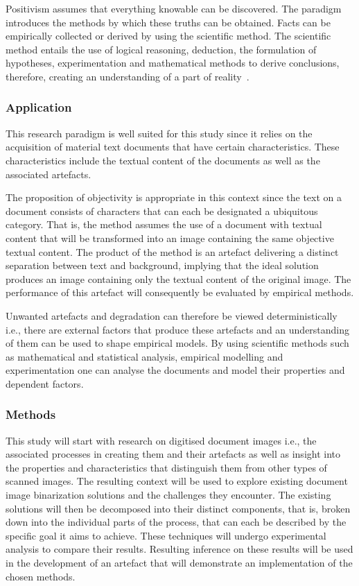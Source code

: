 \documentclass[a4paper, 12pt]{report}
\begin{document}
Positivism assumes that everything knowable can be discovered. The paradigm introduces the methods by which these truths can be obtained. Facts can be empirically collected or derived by using the scientific method. The scientific method entails the use of logical reasoning, deduction, the formulation of hypotheses, experimentation and mathematical methods to derive conclusions, therefore, creating an understanding of a part of reality~\cite{kivunja2017understanding}.

\subsubsection{Application}
This research paradigm is well suited for this study since it relies on the acquisition of material text documents that have certain characteristics. These characteristics include the textual content of the documents as well as the associated artefacts.\par

The proposition of objectivity is appropriate in this context since the text on a document consists of characters that can each be designated a ubiquitous category. That is, the method assumes the use of a document with textual content that will be transformed into an image containing the same objective textual content. The product of the method is an artefact delivering a distinct separation between text and background, implying that the ideal solution produces an image containing only the textual content of the original image. The performance of this artefact will consequently be evaluated by empirical methods.\par

Unwanted artefacts and degradation can therefore be viewed deterministically i.e., there are external factors that produce these artefacts and an understanding of them can be used to shape empirical models. By using scientific methods such as mathematical and statistical analysis, empirical modelling and experimentation one can analyse the documents and model their properties and dependent factors.


\subsubsection{Methods}
This study will start with research on digitised document images i.e., the associated processes in creating them and their artefacts as well as insight into the properties and characteristics that distinguish them from other types of scanned images. The resulting context will be used to explore existing document image binarization solutions and the challenges they encounter. The existing solutions will then be decomposed into their distinct components, that is, broken down into the individual parts of the process, that can each be described by the specific goal it aims to achieve. These techniques will undergo experimental analysis to compare their results. Resulting inference on these results will be used in the development of an artefact that will demonstrate an implementation of the chosen methods. \newpage
\end{document}
